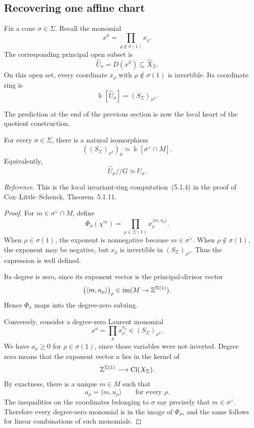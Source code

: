 \subsection{Recovering one affine chart}

Fix a cone \(\sigma\in\Sigma\). Recall the monomial
\[
x^{\widehat\sigma}
=
\prod_{\rho\notin\sigma(1)}x_\rho.
\]
The corresponding principal open subset is
\[
\widehat U_\sigma
=
D(x^{\widehat\sigma})
\subseteq\widehat X_\Sigma.
\]
On this open set, every coordinate \(x_\rho\) with
\(\rho\notin\sigma(1)\) is invertible. Its coordinate ring is
\[
\Bbbk[\widehat U_\sigma]
=
(S_\Sigma)_{x^{\widehat\sigma}}.
\]

The prediction at the end of the previous section is now the local
heart of the quotient construction.

\begin{theorem}
\label{thm:degree-zero-localization-affine-chart}
For every \(\sigma\in\Sigma\), there is a natural isomorphism
\[
\boxed{
\left((S_\Sigma)_{x^{\widehat\sigma}}\right)_0
\simeq
\Bbbk[\sigma^\vee\cap M].
}
\]
Equivalently,
\[
\widehat U_\sigma\mathbin{//}G
\simeq
U_\sigma.
\]
\end{theorem}

\noindent
\textit{Reference.}
This is the local invariant-ring computation~(5.1.4) in the proof of
Cox--Little--Schenck, Theorem~5.1.11.

\begin{proof}
For \(m\in\sigma^\vee\cap M\), define
\[
\Phi_\sigma(\chi^m)
=
\prod_{\rho\in\Sigma(1)}
 x_\rho^{\langle m,u_\rho\rangle}.
\]
When \(\rho\in\sigma(1)\), the exponent is nonnegative because
\(m\in\sigma^\vee\). When \(\rho\notin\sigma(1)\), the exponent may
be negative, but \(x_\rho\) is invertible in
\((S_\Sigma)_{x^{\widehat\sigma}}\). Thus the expression is well
defined.

Its degree is zero, since its exponent vector is the principal-divisor
vector
\[
\bigl(\langle m,u_\rho\rangle\bigr)_\rho
\in\operatorname{im}(M\to\mathbb{Z}^{\Sigma(1)}).
\]
Hence \(\Phi_\sigma\) maps into the degree-zero subring.

Conversely, consider a degree-zero Laurent monomial
\[
x^a=\prod_\rho x_\rho^{a_\rho}
\in(S_\Sigma)_{x^{\widehat\sigma}}.
\]
We have \(a_\rho\geq0\) for \(\rho\in\sigma(1)\), since those
variables were not inverted. Degree zero means that the exponent
vector \(a\) lies in the kernel of
\[
\mathbb{Z}^{\Sigma(1)}\longrightarrow\operatorname{Cl}(X_\Sigma).
\]
By exactness, there is a unique \(m\in M\) such that
\[
a_\rho=\langle m,u_\rho\rangle
\qquad\text{for every }\rho.
\]
The inequalities on the coordinates belonging to \(\sigma\) say
precisely that \(m\in\sigma^\vee\). Therefore every degree-zero
monomial is in the image of \(\Phi_\sigma\), and the same follows for
linear combinations of such monomials.
\end{proof}

